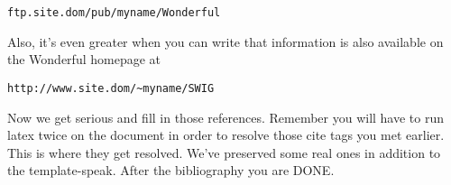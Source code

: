 \documentclass[letterpaper,twocolumn,10pt]{article}
\begin{document}
\begin{center}
{\tt ftp.site.dom/pub/myname/Wonderful}\\
\end{center}

Also, it's even greater when you can write that information is also
available on the Wonderful homepage at

\begin{center}
{\tt http://www.site.dom/\~{}myname/SWIG}
\end{center}

Now we get serious and fill in those references.  Remember you will
have to run latex twice on the document in order to resolve those
cite tags you met earlier.  This is where they get resolved.
We've preserved some real ones in addition to the template-speak.
After the bibliography you are DONE.

{\footnotesize 
}


\theendnotes
\end{document}
